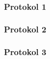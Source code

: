 \subsubsection{Protokol 1}














\subsubsection{Protokol 2}









\subsubsection{Protokol 3}










